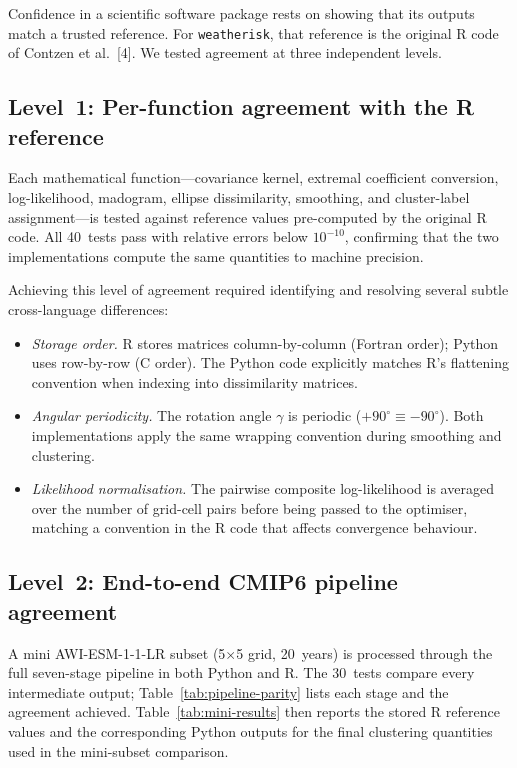 \documentclass[preprint,12pt,a4paper]{elsarticle}
\newcommand{\rev}[1]{{#1}}
\begin{document}
\rev{Confidence in a scientific software package rests on showing
that its outputs match a trusted reference. For
\texttt{weatherisk}, that reference is the original R code of
Contzen et al.~[4]. We tested agreement at three independent
levels.

\subsection{Level~1: Per-function agreement with the R reference}

Each mathematical function---covariance kernel, extremal
coefficient conversion, log-likelihood, madogram, ellipse
dissimilarity, smoothing, and cluster-label assignment---is
tested against reference values pre-computed by the original R
code. All 40~tests pass with relative errors below $10^{-10}$,
confirming that the two implementations compute the same
quantities to machine precision.

Achieving this level of agreement required identifying and
resolving several subtle cross-language differences:
\begin{itemize}
\item \emph{Storage order.} R stores matrices column-by-column
  (Fortran order); Python uses row-by-row (C order). The Python
  code explicitly matches R's flattening convention when indexing
  into dissimilarity matrices.
\item \emph{Angular periodicity.} The rotation angle $\gamma$ is
  periodic ($+90^{\circ} \equiv -90^{\circ}$). Both
  implementations apply the same wrapping convention during
  smoothing and clustering.
\item \emph{Likelihood normalisation.} The pairwise composite
  log-likelihood is averaged over the number of grid-cell pairs
  before being passed to the optimiser, matching a convention in
  the R code that affects convergence behaviour.
\end{itemize}

\subsection{Level~2: End-to-end CMIP6 pipeline agreement}

A mini AWI-ESM-1-1-LR subset (5$\times$5 grid, 20~years) is
processed through the full seven-stage pipeline in both
Python and R. The 30~tests compare every intermediate output;
Table~\ref{tab:pipeline-parity} lists each stage and the
agreement achieved. Table~\ref{tab:mini-results} then reports the
stored R reference values and the corresponding Python outputs for
the final clustering quantities used in the mini-subset comparison.

}
\end{document}
